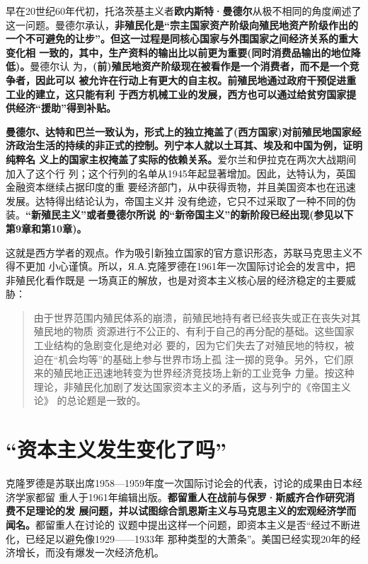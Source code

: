 早在20世纪60年代初，托洛茨基主义者\textbf{欧内斯特·曼德尔}从极不相同的角度阐述了
这一问题。曼德尔承认，\textbf{非殖民化是“宗主国家资产阶级向殖民地资产阶级作出的
  一个不可避免的让步”。但这一过程是同核心国家与外围国家之间经济关系的重大变化相
  一致的，其中，生产资料的输出比以前更为重要(同时消费品输出的地位降低)。}曼德尔认
为，\textbf{(前)殖民地资产阶级现在被看作是一个消费者，而不是一个竞争者，因此可以
  被允许在行动上有更大的自主权。前殖民地通过政府干预促进重工业的建立，这只能有利
  于西方机械工业的发展，西方也可以通过给贫穷国家提供经济“援助”得到补贴。}

\textbf{曼德尔、达特和巴兰一致认为，形式上的独立掩盖了(西方国家)对前殖民地国家经
  济政治生活的持续的非正式的控制。列宁本人就以土耳其、埃及和中国为例，证明纯粹名
  义上的国家主权掩盖了实际的依赖关系。}爱尔兰和伊拉克在两次大战期间加入了这个行
列；这个行列的名单从1945年起显著增加。因此，达特认为，英国金融资本继续占据印度的重
要经济部门，从中获得贡物，并且美国资本也在迅速发展。达特得出结论认为，帝国主义并
没有绝迹，它只不过采取了一种不同的伪装。\textbf{“新殖民主义”或者曼德尔所说
  的“新帝国主义”的新阶段已经出现(参见以下第9章和第10章)。}

这就是西方学者的观点。作为吸引新独立国家的官方意识形态，苏联马克思主义不得不更加
小心谨慎。所以，Я.А.克隆罗德在1961年一次国际讨论会的发言中，把非殖民化看作既是
一场真正的解放，也是对资本主义核心层的经济稳定的主要威胁：
\begin{quotation}
  由于世界范围内殖民体系的崩溃，前殖民地持有者已经丧失或正在丧失对其殖民地的物质
  资源进行不公正的、有利于自己的再分配的基础。这些国家工业结构的急剧变化是绝对必
  要的，因为它们失去了对殖民地的特权，被迫在“机会均等”的基础上参与世界市场上孤
  注一掷的竞争。另外，它们原来的殖民地正迅速地转变为世界经济竞技场上新的工业竞争
  力量。按这种理论，非殖民化加剧了发达国家资本主义的矛盾，这与列宁的《帝国主义论》
  的总论题是一致的。
\end{quotation}

\section{“资本主义发生变化了吗”}
克隆罗德是苏联出席1958—1959年度一次国际讨论会的代表，讨论的成果由日本经济学家都留
重人于1961年编辑出版。\textbf{都留重人在战前与保罗·斯威齐合作研究消费不足理论的发
  展问题，并以试图综合凯恩斯主义与马克思主义的宏观经济学而闻名。}都留重人在讨论的
议题中提出这样一个问题，即资本主义是否“经过不断进化，已经足以避免像1929——1933年
那种类型的大萧条”。美国已经实现20年的经济增长，而没有爆发一次经济危机。

